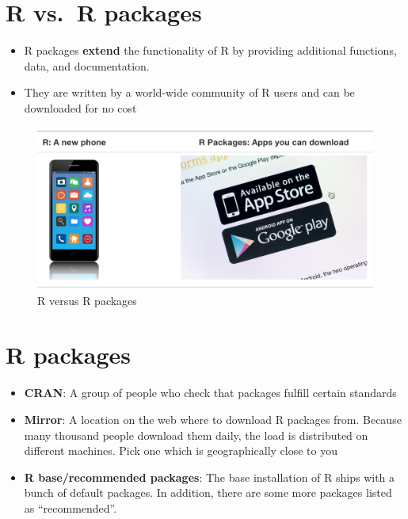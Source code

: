 \documentclass[]{book}
\begin{document}
\hypertarget{r-vs.r-packages}{%
\section{R vs.~R packages}\label{r-vs.r-packages}}

\begin{itemize}
\item
  R packages \textbf{extend} the functionality of R by providing additional functions, data, and documentation.
\item
  They are written by a world-wide community of R users and can be downloaded for no cost
\end{itemize}

\begin{figure}
\centering
\includegraphics{img/r_vs_r_packages.png}
\caption{R versus R packages}
\end{figure}

\hypertarget{r-packages}{%
\section{R packages}\label{r-packages}}

\begin{itemize}
\item
  \textbf{CRAN}: A group of people who check that packages fulfill certain standards
\item
  \textbf{Mirror}: A location on the web where to download R packages from. Because many thousand people download them daily, the load is distributed on different machines. Pick one which is geographically close to you
\item
  \textbf{R base/recommended packages}: The base installation of R ships with a bunch of default packages. In addition, there are some more packages listed as ``recommended''.
\end{itemize}
\end{document}
